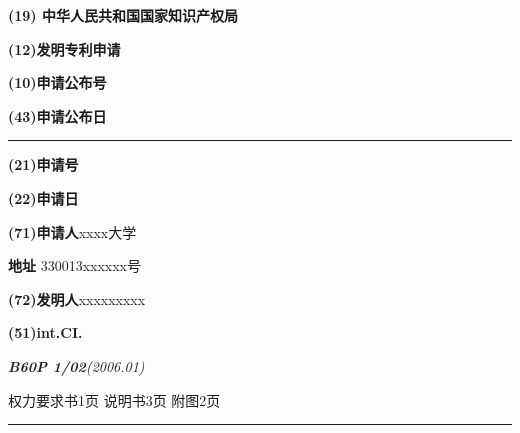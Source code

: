 \documentclass[hyperref]{ctexart}
\begin{document}
	\thispagestyle{empty}
	\clearpage

\begin{flushleft}
	\textbf{{\Large(19) 中华人民共和国国家知识产权局}}
\end{flushleft}
\begin{center}
\textbf{{\LARGE (12)发明专利申请}}
\end{center}



\begin{flushright}
	\textbf{(10)申请公布号}

	\textbf{(43)申请公布日}
	\rule[18pt]{17.3cm}{0.1em}
\end{flushright}
\begin{flushleft}
	\textbf{(21)申请号 }

\textbf{(22)申请日}

\textbf{(71)申请人}\quad  xxxx大学

\hspace{2.5em}\textbf{地址} \quad\hspace{0.5em}330013\quad xxxxxx号


\textbf{(72)发明人}\quad xxx\quad xxx\quad xxx 

\textbf{(51)int.CI.}

\quad\quad\textit{\textbf{B60P 1/02}(2006.01)}
\end{flushleft}
\begin{flushright}
	权力要求书1页  说明书3页  附图2页
	\rule[16pt]{17.3cm}{0.1em}
\end{flushright}
\end{document}
